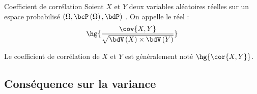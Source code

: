 \documentclass[a4paper,french,bookmarks]{article}
\begin{document}
\begin{definition}{Coefficient de corrélation}{}
    Soient $X$ et $Y$ deux variables aléatoires réelles sur un espace probabilisé $\left(\Omega, \bcP\left(\Omega\right), \bdP \right)$ . On appelle  le réel :
    \[ \hg{\dfrac{\cov{X, Y}}{\sqrt{\bdV\left(X\right) \times \bdV\left(Y\right)}}}\]
\end{definition}
%
\begin{notation}
    Le coefficient de corrélation de $X$ et $Y$ est généralement noté $\hg{\cor{X, Y}}$.
\end{notation}

\subsection{Conséquence sur la variance}
\end{document}
